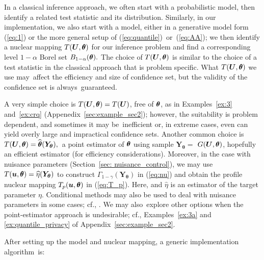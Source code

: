 \documentclass[12pt]{article}
\theoremstyle{shortspace}
\def\*#1{\bm{#1}}
\def\btheta{\mathop{\theta\kern-.45em\hbox{$\theta$}}\nolimits}
\begin{document}
In a classical inference approach, we often start with a probabilistic model, then identify a related test statistic and its distribution. Similarly, in our implementation, we also start with a model, either in a generative model form (\ref{eq:1}) or the more general setup of (\ref{eq:quantile})~or~(\ref{eq:AA}); we then identify 
a nuclear mapping $T(\*U, \btheta)$ for our inference problem and find a corresponding level $1 - \alpha$ Borel set $B_{1 -\alpha}(\btheta).$ The choice of $T(\*U, \btheta)$ is similar to the choice of a test statistic in the classical approach that is problem specific. 
What $T(\*U, \btheta)$ we use may~affect the efficiency and size of confidence set, but the validity of the confidence set is always~guaranteed.

A very simple choice is $T(\*U,\btheta)=T(\*U)$, free of $\btheta$,  as in Examples~\ref{ex:3} and~\ref{ex:crq} (Appenedix~\ref{sec:example_sec2}); however, the suitability 
is problem dependent, and sometimes it may be~inefficient  
or, in extreme cases, even can yield overly large and impractical confidence sets.
Another common choice is $T(\*U, \btheta) = \widehat {\btheta} (\*Y_{\*\theta}),$~a point estimator of $\btheta$ using sample $\*Y_{\*\theta} = $ $G(\*U, \btheta)$,  hopefully an efficient estimator (for efficiency considerations). Moreover, in the case with nuisance parameters (Section~\ref{sec: nuisance_control}), we may use
$T(\*u, \btheta) = \widehat{\eta} (\*Y_{\*\theta})$ to construct $\Gamma_{1 - \gamma}(\*Y_{\*\theta})$
in (\ref{eq:nu}) and obtain the profile nuclear mapping $T_p(\*u, \btheta)$ 
in (\ref{eq:T_p}). Here, and $\widehat{\eta}$ is an estimator of the target parameter $\eta$.  Conditional methods may also be used to deal with nuisance parameters in some cases; cf.,  \cite{wang2022highdimenional}. 
We may also~explore other options when the point-estimator approach is undesirable; cf., Examples~\ref{ex:3a} and \ref{ex:quantile_privacy} of Appendix~\ref{sec:example_sec2}.


After setting up the model and nuclear mapping, a generic implementation algorithm~is:
\end{document}

